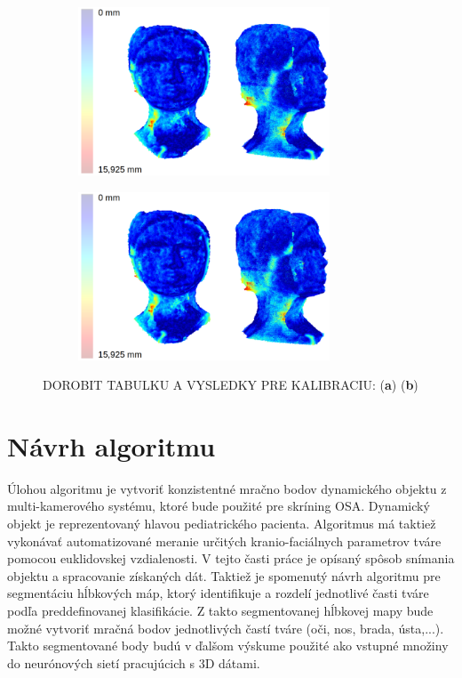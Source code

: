 \begin{figure}[h]
	\centering
	\begin{subfigure}[b]{0.48\textwidth}
		\centering
		\includegraphics[height=5cm]{figures/calibration_hausdorff_multi.png}
		\caption{}
		\label{fig:calib:multi:haus:uncalib}
	\end{subfigure}
	\hfill
	\begin{subfigure}[b]{0.48\textwidth}
		\centering
		\includegraphics[height=5cm]{figures/calibration_hausdorff_multi.png}
		\caption{}
		\label{fig:calib:multi:haus:calib}
	\end{subfigure}
	\caption{DOROBIT TABULKU A VYSLEDKY PRE KALIBRACIU: (\textbf{a})  (\textbf{b})}
	\label{fig:calib:multi:haus}
\end{figure}

\section{Návrh algoritmu}

Úlohou algoritmu je vytvoriť konzistentné mračno bodov dynamického objektu z multi-kamerového systému, ktoré bude použité pre skríning OSA. Dynamický objekt je reprezentovaný hlavou pediatrického pacienta. Algoritmus má taktiež vykonávať automatizované meranie určitých kranio-faciálnych parametrov tváre pomocou euklidovskej vzdialenosti. V tejto časti práce je opísaný spôsob snímania objektu a spracovanie získaných dát. Taktiež je spomenutý návrh algoritmu pre segmentáciu hĺbkových máp, ktorý identifikuje a rozdelí jednotlivé časti tváre podľa preddefinovanej klasifikácie.
Z takto segmentovanej hĺbkovej mapy bude možné vytvoriť mračná bodov jednotlivých častí tváre (oči, nos, brada, ústa,...). Takto segmentované body budú v ďalšom výskume použité ako vstupné množiny do neurónových sietí pracujúcich s 3D dátami. \newline

